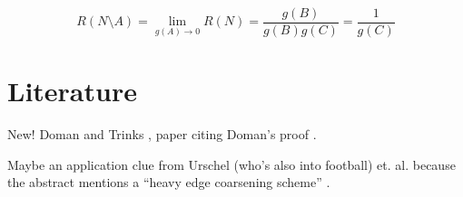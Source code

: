\documentclass{article}
\begin{document}
\begin{enumerate}
\[
R(N\setminus A) = \lim_{g(A)\rightarrow 0}R(N) = \frac{g(B)}{g(B)g(C)} = \frac{1}{g(C)}
\]







\section{Literature}

New! Doman and Trinks \cite{DohmenTrinksAbsWitBrok}, paper citing
Doman's proof \cite{DohIndProofMatroids}.

Maybe an application clue from Urschel (who's also into football) et. al.
because the abstract mentions a ``heavy edge coarsening scheme''
\cite{UrschelFiedlerGraphLaplac}.

\end{enumerate}


\end{document}
